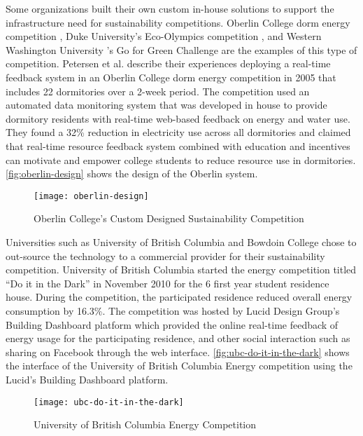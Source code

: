 Some organizations built their own custom in-house solutions to support the infrastructure need for sustainability competitions. Oberlin College dorm energy competition \cite{petersen-dorm-energy-reduction}, Duke University's Eco-Olympics competition \cite{duke-eco-olympics}, and Western Washington University 's Go for Green Challenge \cite{Mauney-thesis} are the examples of this type of competition.  Petersen et al. \cite{petersen-dorm-energy-reduction} describe their experiences deploying a real-time feedback system in an Oberlin College dorm energy competition in 2005 that includes 22 dormitories over a 2-week period. The competition used an automated data monitoring system that was developed in house to provide dormitory residents with real-time web-based feedback on energy and water use. They found a 32\% reduction in electricity use across all dormitories and claimed that real-time resource feedback system combined with education and incentives can motivate and empower college students to reduce resource use in dormitories. \autoref{fig:oberlin-design} shows the design of the Oberlin system. 

\begin{figure}[ht!]
	\centering
		\texttt{[image: oberlin-design]}
		\caption{Oberlin College's Custom Designed Sustainability Competition \cite{petersen-dorm-energy-reduction}}
		\label{fig:oberlin-design}
\end{figure}

Universities such as University of British Columbia \cite{runkle2011dark}  and Bowdoin College\cite{bowdoin} chose to out-source the technology to a commercial provider for their sustainability competition. University of British Columbia started the energy competition titled ``Do it in the Dark'' \cite{runkle2011dark} in November 2010 for the 6 first year student residence house. During the competition, the participated residence reduced overall energy consumption by 16.3\%. The competition was hosted by Lucid Design Group's Building Dashboard platform \cite{building-dashboard} which provided the online real-time feedback of energy usage for the participating residence, and other social interaction such as sharing on Facebook through the web interface. \autoref{fig:ubc-do-it-in-the-dark} shows the interface of the University of British Columbia Energy competition using the Lucid's Building Dashboard platform.

\begin{figure}[ht!]
	\centering
		\texttt{[image: ubc-do-it-in-the-dark]}
		\caption{University of British Columbia Energy Competition\cite{runkle2011dark} }
		\label{fig:ubc-do-it-in-the-dark}
\end{figure}

